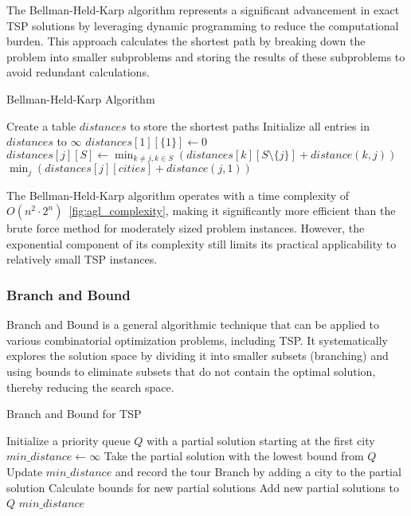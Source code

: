 The Bellman-Held-Karp algorithm represents a significant advancement in exact TSP solutions by leveraging dynamic programming to reduce the computational burden. This approach calculates the shortest path by breaking down the problem into smaller subproblems and storing the results of these subproblems to avoid redundant calculations.

\begin{algorithm}
	\caption{Bellman-Held-Karp Algorithm}\label{bellmanheldkarp}
	\begin{algorithmic}[1]
		\State Create a table $distances$ to store the shortest paths
		\State Initialize all entries in $distances$ to $\infty$
		\State $distances[1][\{1\}] \gets 0$ 
		\State $distances[j][S] \gets \min_{k \neq j, k \in S} (distances[k][S\setminus\{j\}] + distance(k, j))$
		\EndFor
		\EndFor
		\EndFor
		\State \Return $\min_{j}(distances[j][cities] + distance(j, 1))$
		\EndProcedure
	\end{algorithmic}
\end{algorithm}

The Bellman-Held-Karp algorithm operates with a time complexity of $O(n^2 \cdot 2^n)$~\ref{fig:agl_complexity}, making it significantly more efficient than the brute force method for moderately sized problem instances. However, the exponential component of its complexity still limits its practical applicability to relatively small TSP instances.

\subsubsection{Branch and Bound}

Branch and Bound is a general algorithmic technique that can be applied to various combinatorial optimization problems, including TSP. It systematically explores the solution space by dividing it into smaller subsets (branching) and using bounds to eliminate subsets that do not contain the optimal solution, thereby reducing the search space.

\begin{algorithm}
	\caption{Branch and Bound for TSP}\label{branchbound}
	\begin{algorithmic}[1]
		\State Initialize a priority queue $Q$ with a partial solution starting at the first city
		\State $min\_distance \gets \infty$
		\State Take the partial solution with the lowest bound from $Q$
		\State Update $min\_distance$ and record the tour
		\EndIf
		\Else
		\State Branch by adding a city to the partial solution
		\State Calculate bounds for new partial solutions
		\State Add new partial solutions to $Q$
		\EndIf
		\EndWhile
		\State \Return $min\_distance$
		\EndProcedure
	\end{algorithmic}
\end{algorithm}

